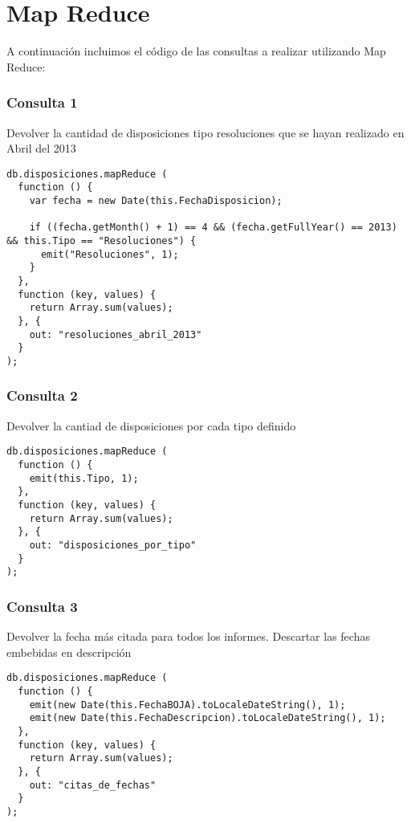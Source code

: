 \section{Map Reduce}

A continuaci\'on incluimos el c\'odigo de las consultas a realizar utilizando Map Reduce:

\subsubsection{Consulta 1}
Devolver la cantidad de disposiciones tipo resoluciones que se hayan realizado en Abril del 2013

\begin{lstlisting}
db.disposiciones.mapReduce (
  function () {
    var fecha = new Date(this.FechaDisposicion);

    if ((fecha.getMonth() + 1) == 4 && (fecha.getFullYear() == 2013) && this.Tipo == "Resoluciones") {
      emit("Resoluciones", 1);
    }
  },
  function (key, values) {
    return Array.sum(values);
  }, {
    out: "resoluciones_abril_2013"
  }
);
\end{lstlisting}

\subsubsection{Consulta 2}
Devolver la cantiad de disposiciones por cada tipo definido

\begin{lstlisting}
db.disposiciones.mapReduce (
  function () {
    emit(this.Tipo, 1);
  },
  function (key, values) {
    return Array.sum(values);
  }, {
    out: "disposiciones_por_tipo"
  }
);
\end{lstlisting}

\subsubsection{Consulta 3}
Devolver la fecha m\'as citada para todos los informes. Descartar las fechas embebidas en descripci\'on

\begin{lstlisting}
db.disposiciones.mapReduce (
  function () {
    emit(new Date(this.FechaBOJA).toLocaleDateString(), 1);
    emit(new Date(this.FechaDescripcion).toLocaleDateString(), 1);
  },
  function (key, values) {
    return Array.sum(values);
  }, {
    out: "citas_de_fechas"
  }
);
\end{lstlisting}

